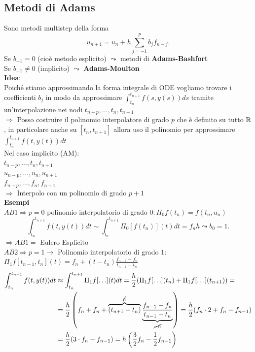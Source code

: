 \documentclass[12px]{article}
\begin{document}
	   \subsection{Metodi di Adams}
	   Sono metodi multistep della forma
	   \[
		   u_{n+1} = u_n  + h \sum^{p}_{j=-1}b_j f_{n-j}
	   .\] 
	   Se $b_{-1} = 0$ (cioè metodo esplicito) $ \leadsto$ metodi di \textbf{Adams-Bashfort}\\
	   Se  $b_{-1} \neq 0$ (implicito)  $\leadsto$ \textbf{Adams-Moulton}\\
	   \textbf{Idea}:\\
	   Poiché stiamo approssimando la forma integrale di ODE vogliamo trovare i coefficienti $b_j$ in modo da approssimare $\displaystyle \int_{t_n}^{t_{n+1}}f(s,y(s))ds$ tramite un'interpolazione nei nodi  $t_{n-p},\ldots,t_n,t_{n+1}$\\
	   $ \Rightarrow  $ Posso costruire il polinomio interpolatore di grado $p$ che è definito su tutto $\mathbb{R}$, in particolare anche su $[t_n, t_{n+1}]$ allora uso il polinomio per approssimare $\displaystyle \int_{t_n}^{t_{n+1}}f(t,y(t))dt$\\
	   Nel caso implicito (AM):\\
	   $t_{n-p},\ldots, t_n,t_{n+1}$ \\
	   $u_{n-p}, \ldots, u_n, u_{n+1}$\\
	   $f_{n-p},\ldots, f_n,f_{n+1}$ \\
	   $ \Rightarrow $ Interpolo con un polinomio di grado $p+1$ \\
	   \textbf{Esempi}\\
	   $AB 1 \Rightarrow p =0 $ polinomio interpolatorio di grado $0: \Pi_0 f(t_n) = f(t_n,u_n)$\\
	   \[
		   \int_{t_n}^{t_{n+1}}f(t,y(t))dt\sim \int_{t_n}^{t_{n+1}}\Pi_0 [f(t_n)](t)dt = f_n h \leadsto b_0 =1
	   .\] 
	   $ \Rightarrow AB 1= $   Eulero Esplicito\\
	   $AB 2 \Rightarrow  p =1 \rightarrow$  Polinomio interpolatorio di grado $1:$\\
	   $\Pi_1f[t_{n-1},t_n](t) = f_n + (t-t_n)\frac{f_{n-1}-f_n}{t_{n-1}-t_n}$\\
	   \[
	   \begin{split}
		   \int_{t_n}^{t_{n+1}}f(t,y(t))dt & \approx \int_{t_n}^{t_{n+1}}\Pi_1f[\ldots](t)dt = \frac h 2 (\Pi_1 f[\ldots](t_n) + \Pi_1 f[\ldots](t_{n+1})) =\\
						   &= \frac{h}{2} \left(f_n + f_n + \overbrace{(t_{n+1} - t_n)}^{\cancel h} \underbrace{\frac{f_{n-1} - f_n}{t_{n-1}-t_n}}_{\cancel{-h}} \right) = \frac h 2 ( f_n\cdot 2 + f_n - f_{n-1} )\\
						   & = \frac h 2(3\cdot f_n - f_{n-1} )= h \left( \frac 32 f_n - \frac 12 f_{n-1} \right)
	   \end{split}
   \]
\end{document}
